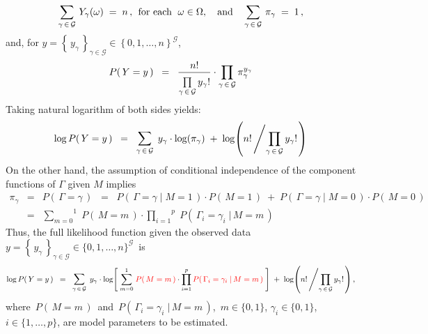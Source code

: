 \begin{remark}
\begin{equation*}
\sum_{\gamma\,\in\,\mathcal{G}}\,Y_{\gamma}(\omega) \; = \; n\,,
\;\,\textnormal{for each \;$\omega\in\Omega$},
\quad\textnormal{and}\quad
\sum_{\gamma\,\in\,\mathcal{G}}\,\pi_{\gamma} \; = \; 1\,,
\end{equation*}
and, for $y = \left\{\,y_{\gamma}\,\right\}_{\gamma\in\mathcal{G}} \in \left\{0,1,\ldots,n\right\}^{\mathcal{G}}$,
\begin{equation*}
P\!\left(\,Y = y\,\right)
\;\; = \;\;
\dfrac{n!}{\overset{{\color{white}.}}{\underset{\gamma\,\in\,\mathcal{G}}{\prod}}\,y_{\gamma}!}
\cdot
\underset{\gamma\,\in\,\mathcal{G}}{\prod}\, \pi_{\gamma}^{y_{\gamma}}
\end{equation*}
Taking natural logarithm of both sides yields:
\begin{equation*}
\log P\!\left(\,Y = y\,\right)
\;\; = \;\;
\underset{\gamma\,\in\,\mathcal{G}}{\textnormal{\large$\sum$}}\;\, y_{\gamma}\cdot\log\!\left(\pi_{\gamma}\right)
\; + \;
\log\!\left(n!\left/\overset{{\color{white}.}}{\underset{\gamma\,\in\,\mathcal{G}}{\prod}}\,y_{\gamma}!\right.\right)
\end{equation*}
On the other hand, the assumption of conditional independence of the component functions of $\Gamma$ given $M$ implies
\begin{eqnarray*}
\pi_{\gamma}
& = & P\!\left(\,\Gamma = \gamma\,\right)
\;\; = \;\;
	P\!\left(\,\Gamma = \gamma\;\vert\;M=1\,\right)\cdot P\!\left(\,M=1\,\right)
	\; + \;
	P\!\left(\,\Gamma = \gamma\;\vert\;M=0\,\right)\cdot P\!\left(\,M=0\,\right)
\\
& = &
	\overset{1}{\underset{m=0}{\sum}}\;
	P\!\left(\,M=m\,\right) \cdot
	\overset{p}{\underset{i=1}{\prod}}\;P\!\left(\,\Gamma_{i} = \gamma_{i}\;\vert\,M=m\,\right)
\end{eqnarray*}
Thus, the full likelihood function given the observed data
\,$y = \left\{\,y_{\gamma}\,\right\}_{\gamma\in\mathcal{G}} \in \{0,1,\ldots,n\}^{\mathcal{G}}$\,
is
\begin{equation*}
\log P\!\left(\,Y = y\,\right)
\;\; = \;\;
\underset{\gamma\,\in\,\mathcal{G}}{\textnormal{\large$\sum$}}\;\, y_{\gamma}\cdot
	\log\!\left[\;
		\overset{1}{\underset{m=0}{\sum}}\;
		{\color{red}P\!\left(\,M=m\,\right)} \cdot
		\overset{p}{\underset{i=1}{\prod}}\,{\color{red}P\!\left(\,\Gamma_{i} = \gamma_{i}\;\vert\,M=m\,\right)}
	\;\right]
\; + \;
\log\!\left(n!\left/\overset{{\color{white}.}}{\underset{\gamma\,\in\,\mathcal{G}}{\prod}}\,y_{\gamma}!\right.\right),
\end{equation*}
where \,$P\!\left(\,M=m\,\right)$\, and \,$P\!\left(\,\Gamma_{i} = \gamma_{i}\;\vert\,M=m\,\right)$,\,
$m \in \{0,1\}$, $\gamma_{i} \in \{0,1\}$, $i\in\{1,\ldots,p\}$,
are model parameters to be estimated.
\end{remark}

